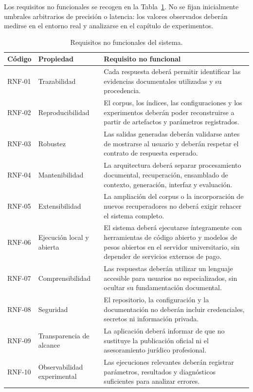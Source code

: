 Los requisitos no funcionales se recogen en la Tabla~\ref{tab:requisitos-no-funcionales}. No se fijan inicialmente umbrales arbitrarios de precisión o latencia: los valores observados deberán medirse en el entorno real y analizarse en el capítulo de experimentos.

\begin{table}[htbp]
    \centering
    \small
    \renewcommand{\arraystretch}{1.2}
    \caption{Requisitos no funcionales del sistema.}
    \label{tab:requisitos-no-funcionales}
    \begin{tabularx}{\textwidth}{|p{1.5cm}|p{3.0cm}|X|}
        \hline
        \textbf{Código} & \textbf{Propiedad} & \textbf{Requisito no funcional} \\
        \hline
        RNF-01 & Trazabilidad & Cada respuesta deberá permitir identificar las evidencias documentales utilizadas y su procedencia. \\
        \hline
        RNF-02 & Reproducibilidad & El corpus, los índices, las configuraciones y los experimentos deberán poder reconstruirse a partir de artefactos y parámetros registrados. \\
        \hline
        RNF-03 & Robustez & Las salidas generadas deberán validarse antes de mostrarse al usuario y deberán respetar el contrato de respuesta esperado. \\
        \hline
        RNF-04 & Mantenibilidad & La arquitectura deberá separar procesamiento documental, recuperación, ensamblado de contexto, generación, interfaz y evaluación. \\
        \hline
        RNF-05 & Extensibilidad & La ampliación del corpus o la incorporación de nuevos recuperadores no deberá exigir rehacer el sistema completo. \\
        \hline
        RNF-06 & Ejecución local y abierta & El sistema deberá ejecutarse íntegramente con herramientas de código abierto y modelos de pesos abiertos en el servidor universitario, sin depender de servicios externos de pago. \\
        \hline
        RNF-07 & Comprensibilidad & Las respuestas deberán utilizar un lenguaje accesible para usuarios no especializados, sin ocultar su fundamentación documental. \\
        \hline
        RNF-08 & Seguridad & El repositorio, la configuración y la documentación no deberán incluir credenciales, secretos ni información privada. \\
        \hline
        RNF-09 & Transparencia de alcance & La aplicación deberá informar de que no sustituye la publicación oficial ni el asesoramiento jurídico profesional. \\
        \hline
        RNF-10 & Observabilidad experimental & Las ejecuciones relevantes deberán registrar parámetros, resultados y diagnósticos suficientes para analizar errores. \\
        \hline
    \end{tabularx}
\end{table}

